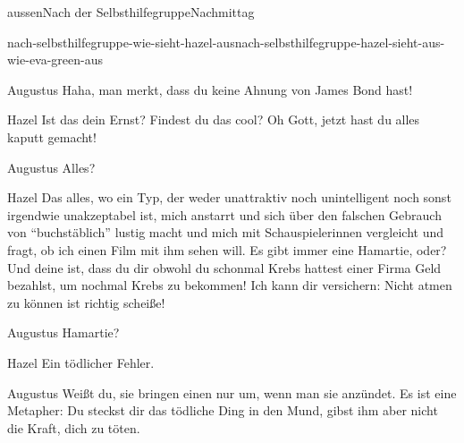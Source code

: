 \documentclass[12pt]{article}
\begin{document}
\begin{scene}[cut to]{aussen}{Nach der Selbsthilfegruppe}{Nachmittag}
\begin{conditional}{nach-selbsthilfegruppe-wie-sieht-hazel-aus}{nach-selbsthilfegruppe-hazel-sieht-aus-wie-eva-green-aus}
            \begin{dialog}{Augustus}
                Haha, man merkt, dass du keine Ahnung von James Bond hast! 
            \end{dialog}
        \end{conditional}


        \begin{dialog}[entsetzt]{Hazel}
            Ist das dein Ernst?
            Findest du das cool?
            Oh Gott, jetzt hast du alles kaputt gemacht!
        \end{dialog}

        \begin{dialog}{Augustus}
            Alles?
        \end{dialog}

        \begin{dialog}{Hazel}
            Das alles, wo ein Typ, der weder unattraktiv noch unintelligent noch sonst irgendwie unakzeptabel ist, mich anstarrt und sich über den falschen Gebrauch von ``buchstäblich'' lustig macht und mich mit Schauspielerinnen vergleicht und fragt, ob ich einen Film mit ihm sehen will.
            Es gibt immer eine Hamartie, oder?
            Und deine ist, dass du dir  obwohl du schonmal Krebs hattest einer Firma Geld bezahlst, um nochmal Krebs zu bekommen!
            Ich kann dir versichern:
            Nicht atmen zu können ist richtig scheiße!
        \end{dialog}

        \begin{dialog}{Augustus}
            Hamartie?
        \end{dialog}

        \begin{dialog}{Hazel}
            Ein tödlicher Fehler.
        \end{dialog}


        \begin{dialog}[lächelnd]{Augustus}
            Weißt du, sie bringen einen nur um, wenn man sie anzündet.
            Es ist eine Metapher: Du steckst dir das tödliche Ding in den Mund, gibst ihm aber nicht die Kraft, dich zu töten.
        \end{dialog}


\end{scene}
\end{document}
